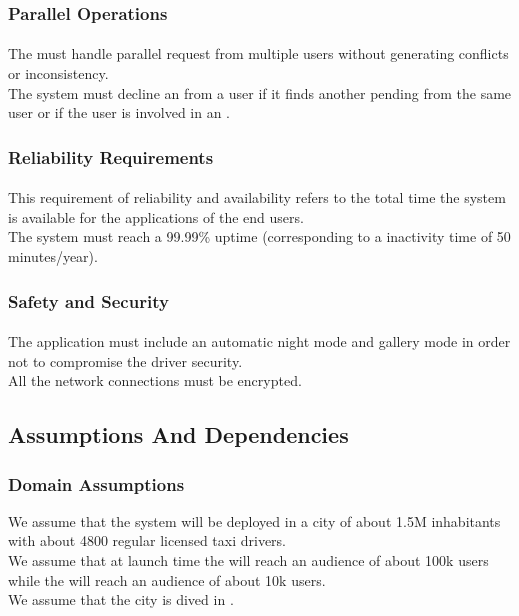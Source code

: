 \subsubsection{Parallel Operations} 
\label{ssub:parrallel_operations}
\paragraph{} 
The  must handle parallel request from multiple users without generating conflicts or inconsistency.\\
The system must decline an  from a user if it finds another pending  from the same user or if the user is involved in an .

\subsubsection{Reliability Requirements} 
\label{ssub:reliability_requirements}
\paragraph{} 
This requirement of reliability and availability refers to the total time the system is available for the applications of the end users.\\
The system must reach a 99.99\% uptime (corresponding to a inactivity time of 50 minutes/year).
\subsubsection{Safety and Security} 
\label{ssub:safety_and_security}
\paragraph{} 
The application must include an automatic night mode and gallery mode in order not to compromise the driver security.\\
All the network connections must be encrypted.

\subsection{Assumptions And Dependencies} 
\label{sub:assumptions_and_dependencies}
\subsubsection{Domain Assumptions} 
\label{ssub:domain}
We assume that the system will be deployed in a city of about 1.5M inhabitants with about 4800 regular licensed taxi drivers.\\
We assume that at launch time the \emph{} will reach an audience of about 100k users while the \emph{} will reach an audience of about 10k users.\\
We assume that the city is dived in \emph{}.
